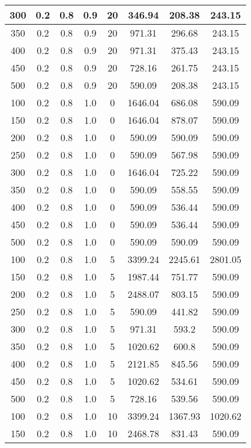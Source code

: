 \documentclass[a4paper, 12pt]{extreport}
\begin{document}
\begin{itemize}
\begin{longtable}{|c|c|c|c|c|c|c|c|}
			300 & 0.2 & 0.8 & 0.9 & 20 & 346.94 & 208.38 & 243.15 \\\hline
			350 & 0.2 & 0.8 & 0.9 & 20 & 971.31 & 296.68 & 243.15 \\\hline
			400 & 0.2 & 0.8 & 0.9 & 20 & 971.31 & 375.43 & 243.15 \\\hline
			450 & 0.2 & 0.8 & 0.9 & 20 & 728.16 & 261.75 & 243.15 \\\hline
			500 & 0.2 & 0.8 & 0.9 & 20 & 590.09 & 208.38 & 243.15 \\\hline
			100 & 0.2 & 0.8 & 1.0 & 0 & 1646.04 & 686.08 & 590.09 \\\hline
			150 & 0.2 & 0.8 & 1.0 & 0 & 1646.04 & 878.07 & 590.09 \\\hline
			200 & 0.2 & 0.8 & 1.0 & 0 & 590.09 & 590.09 & 590.09 \\\hline
			250 & 0.2 & 0.8 & 1.0 & 0 & 590.09 & 567.98 & 590.09 \\\hline
			300 & 0.2 & 0.8 & 1.0 & 0 & 1646.04 & 725.22 & 590.09 \\\hline
			350 & 0.2 & 0.8 & 1.0 & 0 & 590.09 & 558.55 & 590.09 \\\hline
			400 & 0.2 & 0.8 & 1.0 & 0 & 590.09 & 536.44 & 590.09 \\\hline
			450 & 0.2 & 0.8 & 1.0 & 0 & 590.09 & 536.44 & 590.09 \\\hline
			500 & 0.2 & 0.8 & 1.0 & 0 & 590.09 & 590.09 & 590.09 \\\hline
			100 & 0.2 & 0.8 & 1.0 & 5 & 3399.24 & 2245.61 & 2801.05 \\\hline
			150 & 0.2 & 0.8 & 1.0 & 5 & 1987.44 & 751.77 & 590.09 \\\hline
			200 & 0.2 & 0.8 & 1.0 & 5 & 2488.07 & 803.15 & 590.09 \\\hline
			250 & 0.2 & 0.8 & 1.0 & 5 & 590.09 & 441.82 & 590.09 \\\hline
			300 & 0.2 & 0.8 & 1.0 & 5 & 971.31 & 593.2 & 590.09 \\\hline
			350 & 0.2 & 0.8 & 1.0 & 5 & 1020.62 & 600.8 & 590.09 \\\hline
			400 & 0.2 & 0.8 & 1.0 & 5 & 2121.85 & 845.56 & 590.09 \\\hline
			450 & 0.2 & 0.8 & 1.0 & 5 & 1020.62 & 534.61 & 590.09 \\\hline
			500 & 0.2 & 0.8 & 1.0 & 5 & 728.16 & 539.56 & 590.09 \\\hline
			100 & 0.2 & 0.8 & 1.0 & 10 & 3399.24 & 1367.93 & 1020.62 \\\hline
			150 & 0.2 & 0.8 & 1.0 & 10 & 2468.78 & 831.43 & 590.09 \\\hline

\end{longtable}
\end{itemize}
\end{document}
